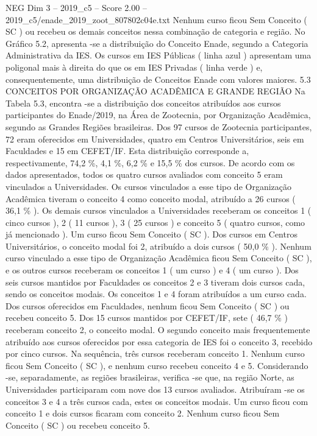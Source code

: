\begin{textsample}{NEG Dim 3 – 2019\_c5 – Score 2.00 – 2019\_c5/enade\_2019\_zoot\_807802c04e.txt}
Nenhum curso ficou Sem Conceito ( SC ) ou recebeu os demais conceitos nessa combinação de categoria e região.
No Gráfico 5.2, apresenta -se a distribuição do Conceito Enade, segundo a Categoria Administrativa da IES.
Os cursos em IES Públicas ( linha azul ) apresentam uma poligonal mais à direita do que os em IES Privadas ( linha verde ) e, consequentemente, uma distribuição de Conceitos Enade com valores maiores. 5.3 CONCEITOS POR ORGANIZAÇÃO ACADÊMICA E GRANDE REGIÃO Na Tabela 5.3, encontra -se a distribuição dos conceitos atribuídos aos cursos participantes do Enade/2019, na Área de Zootecnia, por Organização Acadêmica, segundo as Grandes Regiões brasileiras.
Dos 97 cursos de Zootecnia participantes, 72 eram oferecidos em Universidades, quatro em Centros Universitários, seis em Faculdades e 15 em CEFET/IF.
Esta distribuição corresponde a, respectivamente, 74,2 \%, 4,1 \%, 6,2 \% e 15,5 \% dos cursos.
De acordo com os dados apresentados, todos os quatro cursos avaliados com conceito 5 eram vinculados a Universidades.
Os cursos vinculados a esse tipo de Organização Acadêmica tiveram o conceito 4 como conceito modal, atribuído a 26 cursos ( 36,1 \% ).
Os demais cursos vinculados a Universidades receberam os conceitos 1 ( cinco cursos ), 2 ( 11 cursos ), 3 ( 25 cursos ) e conceito 5 ( quatro cursos, como já mencionado ).
Um curso ficou Sem Conceito ( SC ).
Dos cursos em Centros Universitários, o conceito modal foi 2, atribuído a dois cursos ( 50,0 \% ).
Nenhum curso vinculado a esse tipo de Organização Acadêmica ficou Sem Conceito ( SC ), e os outros cursos receberam os conceitos 1 ( um curso ) e 4 ( um curso ).
Dos seis cursos mantidos por Faculdades os conceitos 2 e 3 tiveram dois cursos cada, sendo os conceitos modais.
Os conceitos 1 e 4 foram atribuídos a um curso cada.
Dos cursos oferecidos em Faculdades, nenhum ficou Sem Conceito ( SC ) ou recebeu conceito 5.
Dos 15 cursos mantidos por CEFET/IF, sete ( 46,7 \% ) receberam conceito 2, o conceito modal.
O segundo conceito mais frequentemente atribuído aos cursos oferecidos por essa categoria de IES foi o conceito 3, recebido por cinco cursos.
Na sequência, três cursos receberam conceito 1.
Nenhum curso ficou Sem Conceito ( SC ), e nenhum curso recebeu conceito 4 e 5.
Considerando -se, separadamente, as regiões brasileiras, verifica -se que, na região Norte, as Universidades participaram com nove dos 13 cursos avaliados.
Atribuíram -se os conceitos 3 e 4 a três cursos cada, estes os conceitos modais.
Um curso ficou com conceito 1 e dois cursos ficaram com conceito 2.
Nenhum curso ficou Sem Conceito ( SC ) ou recebeu conceito 5.

\end{textsample}
